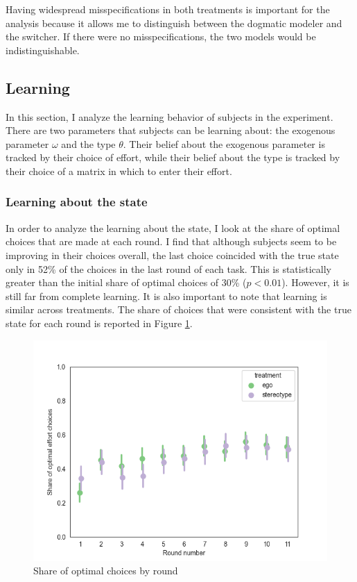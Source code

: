 \documentclass[
  12pt,
]{article}
\begin{document}
Having widespread misspecifications in both treatments is important for
the analysis because it allows me to distinguish between the dogmatic
modeler and the switcher. If there were no misspecifications, the two
models would be indistinguishable.

\hypertarget{learning}{%
\subsection{Learning}\label{learning}}

In this section, I analyze the learning behavior of subjects in the
experiment. There are two parameters that subjects can be learning
about: the exogenous parameter \(\omega\) and the type \(\theta\). Their
belief about the exogenous parameter is tracked by their choice of
effort, while their belief about the type is tracked by their choice of
a matrix in which to enter their effort.

\hypertarget{learning-about-the-state}{%
\subsubsection{Learning about the
state}\label{learning-about-the-state}}

In order to analyze the learning about the state, I look at the share of
optimal choices that are made at each round. I find that although
subjects seem to be improving in their choices overall, the last choice
coincided with the true state only in 52\% of the choices in the last
round of each task. This is statistically greater than the initial share
of optimal choices of 30\% (\(p<0.01\)). However, it is still far from
complete learning. It is also important to note that learning is similar
across treatments. The share of choices that were consistent with the
true state for each round is reported in Figure
\ref{fig:optimal-choices-by-round}.

\begin{figure}
\hypertarget{fig:optimal-choices-by-round}{%
\centering
\includegraphics{../figures/effort_learning.png}
\caption{Share of optimal choices by
round}\label{fig:optimal-choices-by-round}
}
\end{figure}
\end{document}
